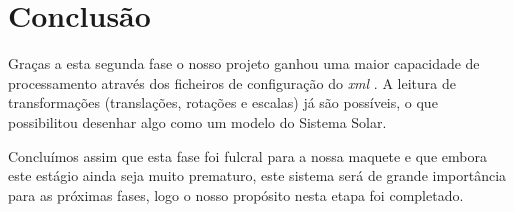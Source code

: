 \documentclass[11pt,a4paper]{report}
\begin{document}
\chapter{Conclusão}

Graças a esta segunda fase o nosso projeto ganhou uma maior capacidade de processamento através dos ficheiros de configuração do \emph{xml} .
A leitura de transformações (translações, rotações e escalas) já são possíveis, o que possibilitou desenhar algo como um modelo do Sistema Solar.

Concluímos assim que esta fase foi fulcral para a nossa maquete e que embora este estágio ainda seja muito prematuro, este sistema será de grande importância para as próximas fases, logo o nosso propósito nesta etapa foi completado.
\end{document}

